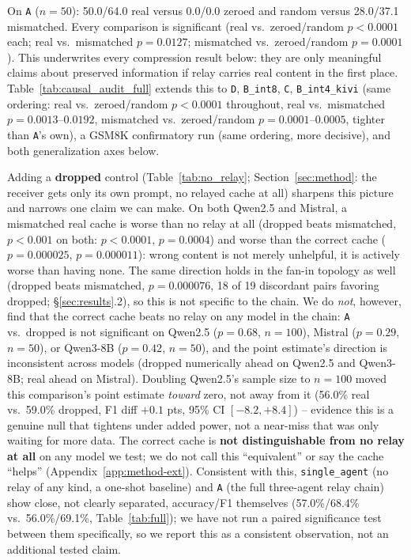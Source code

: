 \documentclass[11pt]{article}
\begin{document}
On \texttt{A} ($n=50$): 50.0/64.0 real versus 0.0/0.0 zeroed and random
versus 28.0/37.1 mismatched. Every comparison is significant (real
vs.\ zeroed/random $p<0.0001$ each; real vs.\ mismatched $p=0.0127$;
mismatched vs.\ zeroed/random $p=0.0001$). This underwrites every
compression result below: they are only meaningful claims about
preserved information if relay carries real content in the first
place. Table~\ref{tab:causal_audit_full}
extends this to \texttt{D}, \texttt{B\_int8}, \texttt{C},
\texttt{B\_int4\_kivi} (same ordering: real vs.\ zeroed/random
$p<0.0001$ throughout, real vs.\ mismatched $p=0.0013$--$0.0192$,
mismatched vs.\ zeroed/random $p=0.0001$--$0.0005$, tighter than
\texttt{A}'s own), a GSM8K confirmatory run (same ordering, more
decisive), and both generalization axes below.



Adding a \textbf{dropped} control (Table~\ref{tab:no_relay};
Section~\ref{sec:method}: the receiver gets only its own prompt, no
relayed cache at all) sharpens this picture and narrows one claim we
can make. On both Qwen2.5 and Mistral, a mismatched real cache is worse
than no relay at all (dropped beats mismatched, $p<0.001$ on both:
$p<0.0001$, $p=0.0004$) and worse than the correct cache
($p=0.000025$, $p=0.000011$): wrong content is not merely unhelpful, it
is actively worse than having none. The same direction holds in the
fan-in topology as well (dropped beats mismatched, $p=0.000076$, 18 of
19 discordant pairs favoring dropped; \S\ref{sec:results}.2), so this
is not specific to the chain. We do \emph{not}, however, find
that the correct cache beats no relay on any model in the chain:
\texttt{A} vs.\ dropped is not significant on Qwen2.5 ($p=0.68$,
$n=100$), Mistral ($p=0.29$, $n=50$), or Qwen3-8B ($p=0.42$, $n=50$),
and the point estimate's direction is inconsistent across models
(dropped numerically ahead on Qwen2.5 and Qwen3-8B; real ahead on
Mistral). Doubling Qwen2.5's sample size to $n=100$ moved this
comparison's point estimate \emph{toward} zero, not away from it
(56.0\% real vs.\ 59.0\% dropped, F1 diff $+0.1$ pts, 95\% CI
$[-8.2,+8.4]$) -- evidence this is a genuine null that tightens under
added power, not a near-miss that was only waiting for more data. The
correct cache is \textbf{not distinguishable from no relay at all} on
any model we test; we do not call this ``equivalent'' or say the cache
``helps'' (Appendix~\ref{app:method-ext}). Consistent with this,
\texttt{single\_agent} (no relay of any kind, a one-shot baseline) and
\texttt{A} (the full three-agent relay chain) show close, not clearly
separated, accuracy/F1 themselves (57.0\%/68.4\% vs.\ 56.0\%/69.1\%,
Table~\ref{tab:full}); we have not run a paired significance test
between them specifically, so we report this as a consistent
observation, not an additional tested claim.
\end{document}
